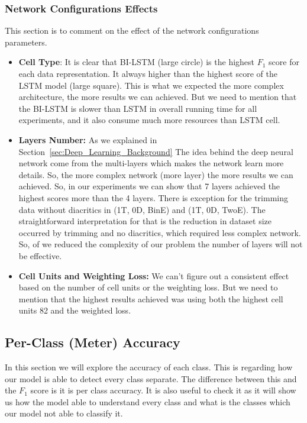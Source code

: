   
\subsubsection{Network Configurations Effects} 

This section is to comment on the effect of the network configurations parameters.
\begin{itemize}
\item \textbf{Cell Type}: It is clear that BI-LSTM  (large circle) is the highest $F_1$ score for each data representation. It always higher than the highest score of the LSTM model (large square). This is what we expected the more complex architecture, the more results we can achieved. But we need to mention that the BI-LSTM is slower than LSTM in overall running time for all experiments, and it also consume much more resources than LSTM cell.
\item \textbf{Layers Number:} As we explained in Section~\ref{sec:Deep_Learning_Background} The idea behind the deep neural network come from the multi-layers which makes the network learn more details. So, the more complex network (more layer) the more results we can achieved. So, in our experiments we can show that 7 layers achieved the highest scores more than the 4 layers. There is exception for the trimming data without diacritics in (1T, 0D, BinE) and (1T, 0D, TwoE). The straightforward interpretation for that is the reduction in dataset size occurred by trimming and no diacritics, which required less complex network. So, of we reduced the complexity of our problem the number of layers will not be effective.

\item \textbf{Cell Units and Weighting Loss:} We can't figure out a consistent effect based on the number of cell units or the weighting loss. But we need to mention that the highest results achieved was using both the highest cell units 82 and the weighted loss.
  \end{itemize}



\subsection{Per-Class (Meter) Accuracy}

In this section we will explore the accuracy of each class. This is regarding how our model is able to detect every class separate. The difference between this and the $F_1$ score is it is per class accuracy. It is also useful to check it as it will show us how the model able to understand every class and what is the classes which our model not able to classify it. 

